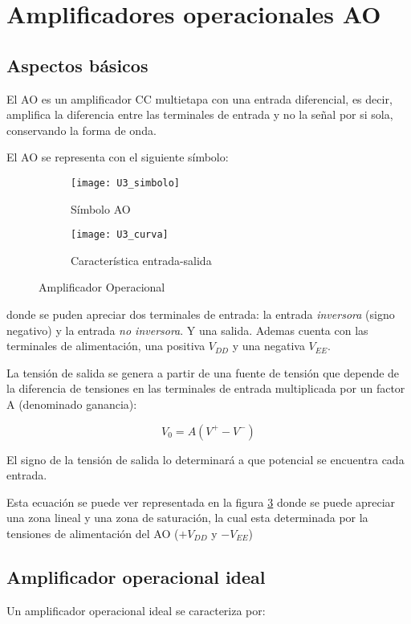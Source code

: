 \section{Amplificadores operacionales AO}

\subsection{Aspectos básicos}
El AO es un amplificador CC multietapa con una entrada diferencial, es decir, amplifica la diferencia entre las terminales de entrada y no la señal por si sola, conservando la forma de onda.

El AO se representa con el siguiente símbolo:

\begin{figure}[h]
	\centering
	\begin{subfigure}[h]{.45\linewidth}
		\centering
		\texttt{[image: U3\_simbolo]}
		\caption{Símbolo AO}
		\label{fig:simbolo_AO}
	\end{subfigure}
	\begin{subfigure}[h]{.45\linewidth}
		\centering
		\texttt{[image: U3\_curva]}
		\caption{Característica entrada-salida}
		\label{fig:caracteristica}
	\end{subfigure}
	\caption{Amplificador Operacional}
\end{figure}

donde se puden apreciar dos terminales de entrada: la entrada \emph{inversora} (signo negativo) y la entrada \emph{no inversora}. Y una salida. Ademas cuenta con las terminales de alimentación, una positiva $V_{DD}$ y una negativa $V_{EE}$.

La tensión de salida se genera a partir de una fuente de tensión que depende de la diferencia de tensiones en las terminales de entrada multiplicada por un factor A (denominado ganancia):

\begin{equation}
	V_{0} = A (V^{+} - V^{-})
\end{equation}

El signo de la tensión de salida lo determinará a que potencial se encuentra cada entrada.

Esta ecuación se puede ver representada en la figura \ref{fig:caracteristica}  donde se puede apreciar una zona lineal y una zona de saturación, la cual esta determinada por la tensiones de alimentación del AO ($+V_{DD}$ y $-V_{EE}$)

\subsection{Amplificador operacional ideal}
Un amplificador operacional ideal se caracteriza por:

